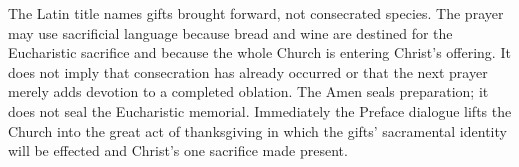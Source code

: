 The Latin title  names gifts brought forward, not consecrated species. The prayer may use sacrificial language because bread and wine are destined for the Eucharistic sacrifice and because the whole Church is entering Christ's offering. It does not imply that consecration has already occurred or that the next prayer merely adds devotion to a completed oblation. The Amen seals preparation; it does not seal the Eucharistic memorial. Immediately the Preface dialogue lifts the Church into the great act of thanksgiving in which the gifts' sacramental identity will be effected and Christ's one sacrifice made present.

